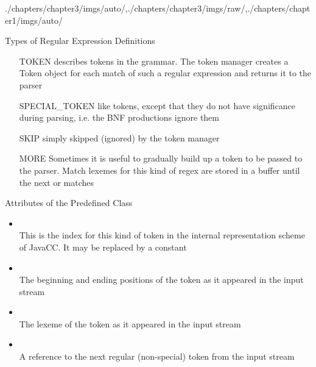 \begin{graphicspathcontext}{{./chapters/chapter3/imgs/auto/},{./chapters/chapter3/imgs/raw/},{./chapters/chapter1/imgs/auto/}}
\begin{bibunit}[apalike]
\begin{frame}{Types of Regular Expression Definitions }
	\begin{enumerate}
	\item[TOKEN] describes tokens in the grammar. The token manager creates a Token object for each match of such a regular expression and returns it to the parser
	\vfill
	\item[SPECIAL\_TOKEN] like tokens, except that they do not have significance during parsing, i.e. the BNF productions ignore them
	\vfill
	\item[SKIP] simply skipped (ignored) by the token manager
	\vfill
	\item[MORE] Sometimes it is useful to gradually build up a token to be passed to the parser. Match lexemes for this kind of regex are stored in a buffer until the next  or  matches
	\end{enumerate}
\end{frame}

\begin{frame}{Attributes of the Predefined  Class}
	\begin{itemize}
	\item {} \\
		This is the index for this kind of token in the internal representation scheme of JavaCC. It may be replaced by a constant
	\vfill
	\item {} \\
		The beginning and ending positions of the token as it appeared in the input stream
	\vfill
	\item {} \\
		The lexeme of the token as it appeared in the input stream
	\vfill
	\item {} \\
		A reference to the next regular (non-special) token from the input stream
	\end{itemize}
\end{frame}


\end{bibunit}
\end{graphicspathcontext}
